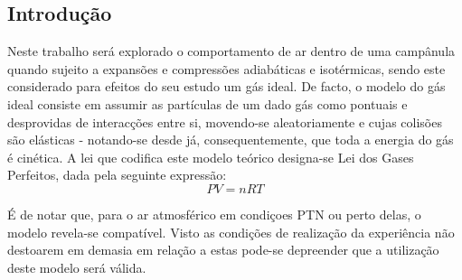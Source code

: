 \documentclass[9pt]{extarticle}
\begin{document}
\begin{multicols}{2}

\section{Introdução}

\par Neste trabalho será explorado o comportamento de ar dentro de uma campânula quando sujeito a expansões e compressões adiabáticas e isotérmicas, sendo este considerado para efeitos do seu estudo um gás ideal. De facto, o modelo do gás ideal consiste em assumir as partículas de um dado gás como pontuais e desprovidas de interacções entre si, movendo-se aleatoriamente e cujas colisões são elásticas - notando-se desde já, consequentemente, que toda a energia do gás é cinética. A lei que codifica este modelo teórico designa-se Lei dos Gases Perfeitos, dada pela seguinte expressão:
\begin{equation} \label{perfeitos}
PV = nRT
\end{equation}
\begin{center}
\par{}
\end{center}

\par É de notar que, para o ar atmosférico em condiçoes PTN ou perto delas, o modelo revela-se compatível. Visto as condições de realização da experiência não destoarem em demasia em relação a estas pode-se depreender que a utilização deste modelo será válida.


\end{multicols}
\end{document}
